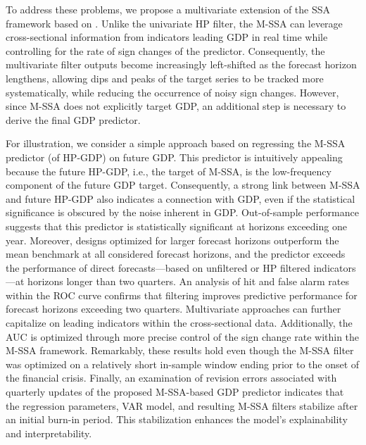 \documentclass[11pt,a4paper]{article}
\begin{document}
To address these problems, we propose a multivariate extension of the SSA framework based on \cite{Wildi2024}. Unlike the univariate HP filter, the M-SSA can leverage cross-sectional information from indicators leading GDP in real time while controlling for the rate of sign changes of the predictor. Consequently, the multivariate filter outputs become increasingly left-shifted as the forecast horizon lengthens, allowing dips and peaks of the target series to be tracked more systematically, while reducing the occurrence of noisy sign changes. However, since M-SSA does not explicitly target GDP, an additional step is necessary to derive the final GDP predictor.%

For illustration, we consider a simple approach based on regressing the M-SSA predictor (of HP-GDP) on future GDP. This predictor is intuitively appealing because the future HP-GDP, i.e., the target of M-SSA, is the low-frequency component of the future GDP target. Consequently, a strong link between M-SSA and future HP-GDP also indicates a connection with GDP, even if the statistical significance is obscured by the noise inherent in GDP. Out-of-sample performance suggests that this predictor is statistically significant at horizons exceeding one year. Moreover, designs optimized for larger forecast horizons outperform the mean benchmark at all considered forecast horizons, and the predictor exceeds the performance of direct forecasts---based on unfiltered or HP filtered indicators---at horizons longer than two quarters. An analysis of hit and false alarm rates within the ROC curve confirms that filtering improves predictive performance for forecast horizons exceeding two quarters. Multivariate approaches can further capitalize on leading indicators within the cross-sectional data. Additionally, the AUC is optimized through more precise control of the sign change rate within the M-SSA framework. Remarkably, these results hold even though the M-SSA filter was optimized on a relatively short in-sample window ending prior to the onset of the financial crisis. Finally, an examination of revision errors associated with quarterly updates of the proposed M-SSA-based GDP predictor indicates that the regression parameters, VAR model, and resulting M-SSA filters stabilize after an initial burn-in period. This stabilization enhances the model’s explainability and interpretability.
\end{document}
